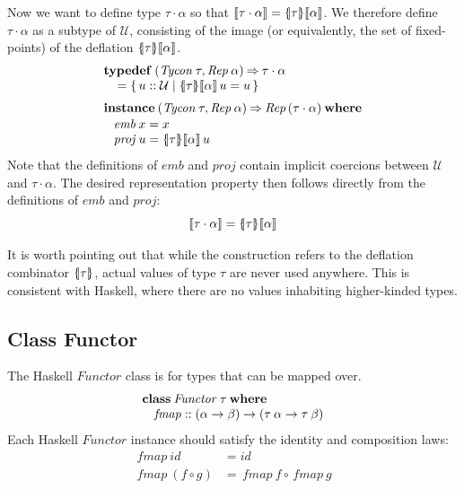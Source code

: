 \documentclass{sigplanconf}
\newcommand{\To}{\mathbin{\Rightarrow}}
\newcommand{\U}{\ensuremath{\mathcal{U}}}
\newcommand{\REP}[1]{\ensuremath{\llbracket#1\rrbracket}}
\newcommand{\symlbrace}{\mathopen{\lbrace\mkern-4.5mu\mid}}
\newcommand{\symrbrace}{\mathclose{\mid\mkern-4.5mu\rbrace}}
\newcommand{\TC}[1]{\ensuremath{\symlbrace#1\symrbrace}}
\newcommand{\kwd}[1]{\mathbf{#1}}
\newcommand{\hsc}[1]{\ensuremath{\mathit{#1}}}
\newcommand{\hsid}{\hsc{id}}
\newcommand{\hsemb}{\hsc{emb}}
\newcommand{\hsprj}{\hsc{proj}}
\newcommand{\hsproj}{\hsc{proj}}
\newcommand{\fmap}{\,\hsc{fmap}} %
\newcommand{\tA}{\alpha}
\newcommand{\tB}{\beta}
\newcommand{\tT}{\tau}
\theoremstyle{definition}
\begin{document}
Now we want to define type $\tT\cdot\tA$ so that $\REP{\tT\cdot\tA} = \TC{\tT}\REP{\tA}$. We therefore define $\tT\cdot\tA$ as a subtype of $\U$, consisting of the image (or equivalently, the set of fixed-points) of the deflation $\TC{\tT}\REP{\tA}$.
%
\begin{align*}
  & \kwd{typedef}\:(\hsc{Tycon}\:\tT, \hsc{Rep}\:\tA) \To \tT\cdot\tA
  \\[-\jot]
  & \hspace{8pt}
  = \{\,u::\U \mid \TC{\tT}\REP{\tA}\,{u}={u}\,\}
  \\[\jot]
  & \kwd{instance}\:(\hsc{Tycon}\:\tT, \hsc{Rep}\:\tA) \To \hsc{Rep}\,(\tT\cdot\tA)\:
  \kwd{where}
  \\[-\jot]
  & \hspace{8pt}
  \begin{alignedat}{2}
    & \hsemb\:x = x \\[-\jot]
    & \hsprj\:u = \TC{\tT}\REP{\tA}\,u
  \end{alignedat}
\end{align*}
%
Note that the definitions of $\hsemb$ and $\hsproj$ contain implicit coercions between $\U$ and $\tT\cdot\tA$. The desired representation property then follows directly from the definitions of $\hsemb$ and $\hsproj$:
%
\begin{equation}
\REP{\tT\cdot\tA} = \TC{\tT}\REP{\tA}
\end{equation}

It is worth pointing out that while the construction refers to the deflation combinator $\TC{\tT}$, actual values of type $\tT$ are never used anywhere. This is consistent with Haskell, where there are no values inhabiting higher-kinded types.

\subsection{Class Functor}

The Haskell \hsc{Functor} class is for types that can be mapped over.
%
%
\begin{align*}
& \kwd{class}\:\hsc{Functor}\:\tT\:\kwd{where} \\[-\jot]
& \hspace{8pt} \fmap :: (\tA \to \tB) \to (\tT\:\tA \to \tT\:\tB)
\end{align*}
%
Each Haskell \hsc{Functor} instance should satisfy the identity and composition laws:
%
\begin{align}
  \fmap\:\hsid &= \hsid \\
  \fmap\:(f \circ g) &= \fmap\:f \circ \fmap\:g
\end{align}
\end{document}
